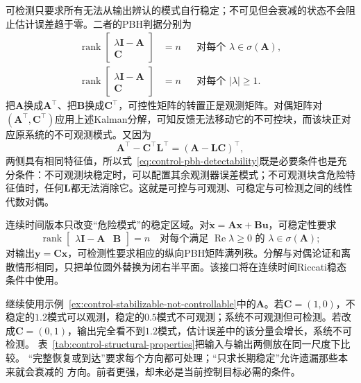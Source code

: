可检测只要求所有无法从输出辨认的模式自行稳定；不可见但会衰减的状态不会阻止估计误差趋于零。二者的PBH判据分别为
\begin{align}
  \operatorname{rank}
  \begin{bmatrix}
    \lambda\bm{I}-\bm{A}\\
    \bm{C}
  \end{bmatrix}
  &=n
  &&\text{对每个 }\lambda\in\sigma(\bm{A}),
  \label{eq:control-pbh-observability}\\
  \operatorname{rank}
  \begin{bmatrix}
    \lambda\bm{I}-\bm{A}\\
    \bm{C}
  \end{bmatrix}
  &=n
  &&\text{对每个 }|\lambda|\geq1.
  \label{eq:control-pbh-detectability}
\end{align}
把$\bm{A}$换成$\bm{A}^{\top}$、把$\bm{B}$换成$\bm{C}^{\top}$，可控性矩阵的转置正是观测矩阵。对偶矩阵对$(\bm{A}^{\top},\bm{C}^{\top})$应用上述Kalman分解，可知反馈无法移动它的不可控块，而该块正对应原系统的不可观测模式。又因为
\[
  \bm{A}^{\top}-\bm{C}^{\top}\bm{L}^{\top}
  =
  (\bm{A}-\bm{L}\bm{C})^{\top},
\]
两侧具有相同特征值，所以式~\eqref{eq:control-pbh-detectability}既是必要条件也是充分条件：不可观测块稳定时，可以配置其余观测器误差模式；不可观测块含危险特征值时，任何$\bm{L}$都无法消除它。这就是可控与可观测、可稳定与可检测之间的线性代数对偶。

连续时间版本只改变“危险模式”的稳定区域。对$\dot{\bm{x}}=\bm{A}\bm{x}+\bm{B}\bm{u}$，可稳定性要求
\[
  \operatorname{rank}
  \begin{bmatrix}
    \lambda\bm{I}-\bm{A}&\bm{B}
  \end{bmatrix}
  =n
  \quad
  \text{对每个满足 }\operatorname{Re}\lambda\geq0
  \text{ 的 }\lambda\in\sigma(\bm{A});
\]
对输出$\bm{y}=\bm{C}\bm{x}$，可检测性要求相应的纵向PBH矩阵满列秩。分解与对偶论证和离散情形相同，只把单位圆外替换为闭右半平面。该接口将在连续时间Riccati稳态条件中使用。

继续使用示例~\ref{ex:control-stabilizable-not-controllable}中的$\bm{A}$。若$\bm{C}=(1,0)$，不稳定的$1.2$模式可以观测，稳定的$0.5$模式不可观测；系统不可观测但可检测。若改成$\bm{C}=(0,1)$，输出完全看不到$1.2$模式，估计误差中的该分量会增长，系统不可检测。
表~\ref{tab:control-structural-properties}把输入与输出两侧放在同一尺度下比较。
“完整恢复或到达”要求每个方向都可处理；“只求长期稳定”允许遗漏那些本来就会衰减的
方向。前者更强，却未必是当前控制目标必需的条件。


